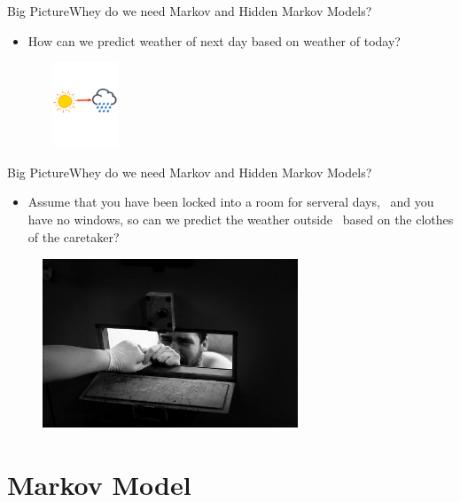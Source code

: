 \documentclass[10pt]{beamer}
\begin{document}
\begin{frame}{Big Picture}{Whey do we need Markov and Hidden Markov Models?}
  \begin{itemize}
    \item How can we predict weather of next day based on weather of today?
  \end{itemize}
  \begin{figure}[h]
    \centering
    \includegraphics[width=1in,height=1in]{figures/sunny_to_rainny.png}
  \end{figure}
\end{frame}

\begin{frame}{Big Picture}{Whey do we need Markov and Hidden Markov Models?}
  \begin{itemize}
    \item Assume that you have been locked into a room for serveral days, \
          and you have no windows, so can we predict the weather outside \
          based on the clothes of the caretaker?
  \end{itemize}
  \begin{figure}[h]
    \centering
    \includegraphics[width=3in,height=2in]{figures/prisoner.jpg}
  \end{figure}
\end{frame}

\section{Markov Model}
\end{document}
